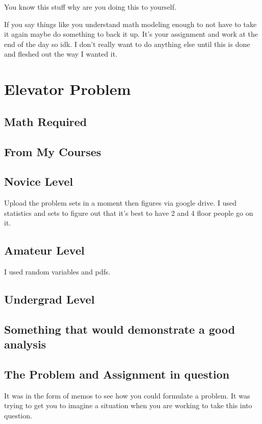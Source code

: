 You know this stuff why are you doing this to yourself. 

If you say things like you understand math modeling enough to not have to take it again maybe do something to back it up. It's your assignment and work at the end of the day so idk. I don't really want to do anything else until this is done and fleshed out the way I wanted it. 

\section{Elevator Problem}

\subsection{Math Required}







\subsection{From My Courses}

\subsection{Novice Level}

Upload the problem sets in a moment then figures via google drive. 
I used statistics and sets to figure out that it's best to have 2 and 4 floor people go on it. 


\subsection{Amateur Level}
I used random variables and pdfs. 


\subsection{Undergrad Level}

\subsection{Something that would demonstrate a good analysis}








\subsection{The Problem and Assignment in question}
It was in the form of memos to see how you could formulate a problem. It was trying to get you to imagine a situation when you are working to take this into question. \\ 

